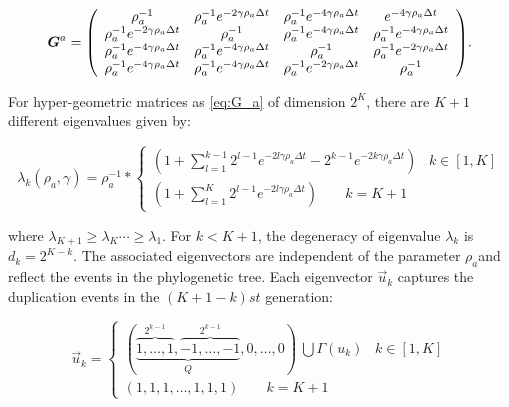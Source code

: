 \documentclass[preprint,amsmath,amssymb,superscriptaddress,showpacs,pre]{revtex4-1}
\let\originalleft\left
\let\originalright\right
\renewcommand{\left}{\mathopen{}\mathclose\bgroup\originalleft}
\renewcommand{\right}{\aftergroup\egroup\originalright}
\begin{document}
\begin{equation} 
\bm G^a =  \left(
\begin{array}{cccc}
{  \rho^{-1}_a } & {\rho^{-1}_a } e ^{-2\gamma\rho_a\Delta t} & {\rho^{-1}_a } e ^{-4\gamma\rho_a\Delta t}& {e ^{-4\gamma\rho_a\Delta t}} \\
{\rho^{-1}_a } e ^{-2\gamma\rho_a\Delta t} & {\rho^{-1}_a } & {\rho^{-1}_a } e ^{-4\gamma\rho_a\Delta t} & {\rho^{-1}_a } e ^{-4\gamma\rho_a\Delta t} \\
{\rho^{-1}_a } e ^{-4\gamma\rho_a\Delta t} & {\rho^{-1}_a} e ^{-4\gamma\rho_a\Delta t}& {\rho^{-1}_a } & {\rho^{-1}_a } e ^{-2\gamma\rho_a\Delta t}\\
{\rho^{-1}_a } e ^{-4\gamma\rho_a\Delta t} & {\rho^{-1}_a } e ^{-4\gamma\rho_a\Delta t} & {\rho^{-1}_a } e ^{-2\gamma\rho_a\Delta t} & {\rho^{-1}_a } \\
\end{array}\label{eq:G_a}
\right).
\end{equation}

For hyper-geometric matrices as \eqref{eq:G_a} of dimension $2^K$, there are $K+1$ different eigenvalues  given by: 

\begin{equation}
\label{eq:lambda_hyper}
\lambda_k(\rho_a,\gamma) =\rho^{-1}_a *
\begin{cases}
 (1+\sum_{l=1}^{k-1} 2^{l-1} e ^{-2l\gamma\rho_a\Delta t}-2^{k-1} e ^{-2k\gamma\rho_a\Delta t})\;\;\; k\in[1,K] \\
 (1+\sum_{l=1}^{K} 2^{l-1} e ^{-2l\gamma\rho_a\Delta t}) \;\;\;\;\;\;\;k=K+1
\end{cases}
\end{equation}

where $\lambda_{K+1}\ge\lambda_{K}\cdots\ge\lambda_{1}$. For $k<K+1$, the degeneracy of eigenvalue $\lambda_k$ is $d_k=2^{K-k}$.  
The associated eigenvectors are independent of the parameter $\rho_a$and reflect the events in the phylogenetic tree.
Each eigenvector $\vec{u}_k$ captures the duplication events in the $(K+1 -k) st$ generation:

\begin{equation} 
\nonumber
 \vec{u}_k =
\begin{cases}
{(\underbrace{\overbrace{1,\ldots,1}^{2^{k-1}},\overbrace{-1,\ldots,-1}^{2^{k-1}}}_Q,0,\ldots,0)\ \bigcup \Gamma(u_k) } \;\;\; k\in[1,K] \\
(1,1,1,\ldots,1,1,1)\;\;\;\;\;\;\;k=K+1
\label{eq:eigenvec_simpler_case}
\end{cases}	
\end{equation}
\end{document}
